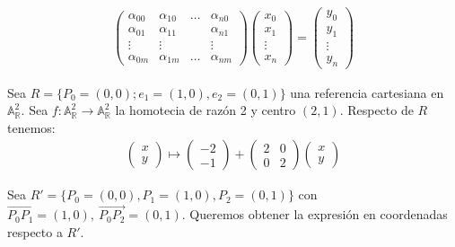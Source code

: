 \documentclass[14pt]{book}
\begin{document}
\begin{align*}
\left(\begin{array}{cccc}
\alpha_{00} & \alpha_{10} & \dots & \alpha_{n0} \\
\alpha_{01} & \alpha_{11} &  & \alpha_{n1} \\
\vdots & \vdots & & \vdots \\
\alpha_{0m} & \alpha_{1m} & \dots & \alpha_{nm}
\end{array}\right)
\left(
\begin{array}{c}
x_0 \\x_1 \\ \vdots \\ x_n
\end{array}\right) = \left(
\begin{array}{c}
y_0 \\y_1 \\ \vdots \\ y_n
\end{array}\right)
\end{align*}

\begin{ej}
	Sea $R = \{P_0 = (0,0); e_1 = (1,0), e_2 = (0,1)\}$ una referencia cartesiana en $\mathbb{A}_\mathbb{R}^2$. Sea $f:\mathbb{A}_\mathbb{R}^2 \to \mathbb{A}_\mathbb{R}^2$ la homotecia de razón 2 y centro $(2,1)$. Respecto de $R$ tenemos:
	\begin{align*}
	\left(\begin{array}{c}
	x \\ y
	\end{array}\right) \mapsto
	\left(\begin{array}{c}
	-2 \\ -1
	\end{array}\right) +
	\left(\begin{array}{cc}
	2 & 0 \\ 0 & 2
	\end{array}\right)
	\left(\begin{array}{c}
	x \\ y
	\end{array}\right)
	\end{align*}
	
	Sea $R' = \{P_0 = (0,0), P_1 = (1,0), P_2 = (0,1)\}$ con $\overrightarrow{P_0 P_1} = (1,0),\ \overrightarrow{P_0 P_2} = (0,1)$. Queremos obtener la expresión en coordenadas respecto a $R'$.
\end{ej}

\end{document}
